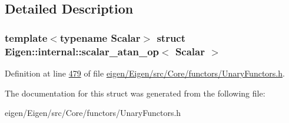 \subsection{Detailed Description}
\subsubsection*{template$<$typename Scalar$>$\newline
struct Eigen\+::internal\+::scalar\+\_\+atan\+\_\+op$<$ Scalar $>$}



Definition at line \hyperlink{eigen_2_eigen_2src_2_core_2functors_2_unary_functors_8h_source_l00479}{479} of file \hyperlink{eigen_2_eigen_2src_2_core_2functors_2_unary_functors_8h_source}{eigen/\+Eigen/src/\+Core/functors/\+Unary\+Functors.\+h}.



The documentation for this struct was generated from the following file\+:\begin{DoxyCompactItemize}
\item 
eigen/\+Eigen/src/\+Core/functors/\+Unary\+Functors.\+h\end{DoxyCompactItemize}
